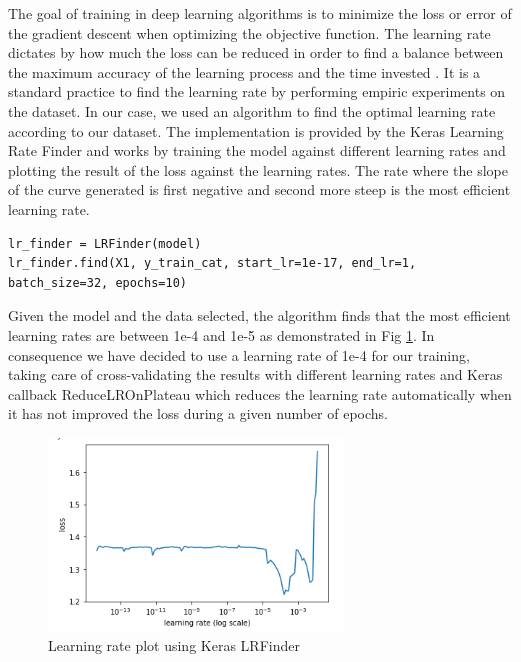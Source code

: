 \documentclass[12pt,a4paper]{scrartcl}
\begin{document}
The goal of training in deep learning algorithms is to minimize the loss or error of the gradient descent when optimizing the objective function. The learning rate dictates by how much the loss can be reduced in order to find a balance between the maximum accuracy of the learning process and the time invested \cite{Zhang2021}. It is a standard practice to find the learning rate by performing empiric experiments on the dataset. In our case, we used an algorithm to find the optimal learning rate according to our dataset. The implementation is provided by the Keras Learning Rate Finder \cite{chollet2015keras} and works by training the model against different learning rates and plotting the result of the loss against the learning rates. The rate where the slope of the curve generated is first negative and second more steep is the most efficient learning rate. 

\begin{lstlisting}[caption={Learning Rate Finder, the jupyter-notebook \emph{Learning\_Rate\_Finder.ipynb} is used to find the learning rate}, label={lst:learning-rate-finder}]
lr_finder = LRFinder(model)
lr_finder.find(X1, y_train_cat, start_lr=1e-17, end_lr=1, batch_size=32, epochs=10)
\end{lstlisting}

Given the model and the data selected, the algorithm finds that the most efficient learning rates are between 1e-4 and 1e-5 as demonstrated in Fig \ref{fig:lr_plot}. In consequence we have decided to use a learning rate of 1e-4 for our training, taking care of cross-validating the results with different learning rates and Keras callback ReduceLROnPlateau \cite{chollet2015keras} which reduces the learning rate automatically when it has not improved the loss during a given number of epochs.


\begin{figure}[H]
    \centering
    \includegraphics[width=0.7\textwidth]{./images/learning_rate_plot.png}
    \caption{Learning rate plot using Keras LRFinder}
    \label{fig:lr_plot}
\end{figure}
\end{document}
